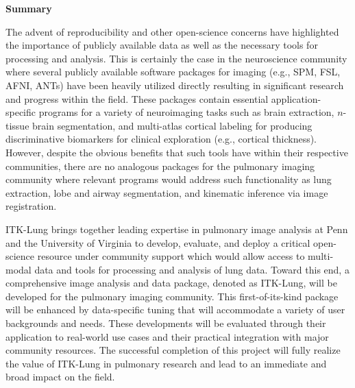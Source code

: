 \documentclass[11pt,]{article}
\title{}
\author{}
\date{}
\begin{document}
\maketitle



\begin{center}
{\bf Summary}
\end{center}

The advent of reproducibility and other open-science concerns have
highlighted the importance of publicly available data as well as the
necessary tools for processing and analysis. This is certainly the case
in the neuroscience community where several publicly available software
packages for imaging (e.g., SPM, FSL, AFNI, ANTs) have been heavily
utilized directly resulting in significant research and progress within
the field. These packages contain essential application-specific
programs for a variety of neuroimaging tasks such as brain extraction,
$n$-tissue brain segmentation, and multi-atlas cortical labeling for
producing discriminative biomarkers for clinical exploration (e.g.,
cortical thickness). However, despite the obvious benefits that such
tools have within their respective communities, there are no analogous
packages for the pulmonary imaging community where relevant programs
would address such functionality as lung extraction, lobe and airway
segmentation, and kinematic inference via image registration.

ITK-Lung brings together leading expertise in pulmonary image analysis
at Penn and the University of Virginia to develop, evaluate, and deploy
a critical open-science resource under community support which would
allow access to multi-modal data and tools for processing and analysis
of lung data. Toward this end, a comprehensive image analysis and data
package, denoted as ITK-Lung, will be developed for the pulmonary
imaging community. This first-of-its-kind package will be enhanced by
data-specific tuning that will accommodate a variety of user backgrounds
and needs. These developments will be evaluated through their
application to real-world use cases and their practical integration with
major community resources. The successful completion of this project
will fully realize the value of ITK-Lung in pulmonary research and lead
to an immediate and broad impact on the field.
\end{document}
